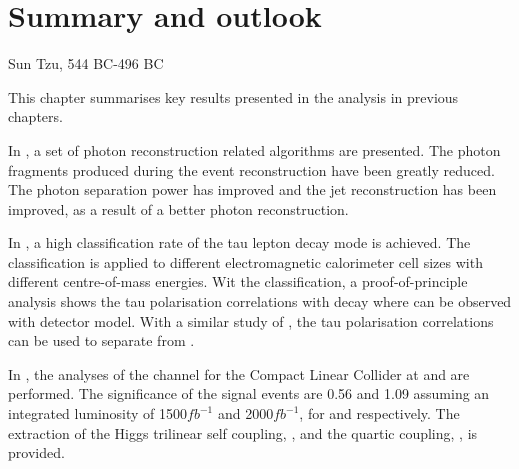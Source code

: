 \chapter{Summary and outlook}
\label{chap:summary}



%
{Sun Tzu, 544 BC-496 BC}




This chapter summarises key results presented in the analysis in previous chapters.

In , a set of photon reconstruction related algorithms are presented. The photon fragments produced during the event reconstruction have been greatly reduced. The photon separation power has improved and the jet reconstruction has been improved, as a result of a better photon reconstruction.

In , a high classification rate of the tau lepton decay mode is achieved. The classification is applied to different electromagnetic calorimeter cell sizes with different centre-of-mass energies. Wit the classification, a proof-of-principle analysis shows the tau polarisation correlations with \ZToTauTau decay where \tauToPion can be observed with \ILD detector model. With a similar study of \HiggsToTauTau,  the tau polarisation correlations can be used to separate \PHiggs from \PZ.
 
 
 In , the analyses of the \eeToHHbbWWFull channel for the Compact Linear Collider at  and  are performed. The significance of the signal events are 0.56 and 1.09 assuming an integrated luminosity of 1500$fb^{-1}$ and 2000$fb^{-1}$, for   and  respectively. The extraction of the Higgs trilinear self coupling, \gHHH, and the quartic coupling, \gWWHH, is provided.

